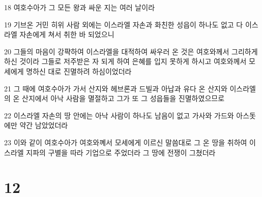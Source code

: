 \par 18 여호수아가 그 모든 왕과 싸운 지는 여러 날이라
\par 19 기브온 거민 히위 사람 외에는 이스라엘 자손과 화친한 성읍이 하나도 없고 다 이스라엘 자손에게 쳐서 취한 바 되었으니
\par 20 그들의 마음이 강퍅하여 이스라엘을 대적하여 싸우러 온 것은 여호와께서 그리하게 하신 것이라 그들로 저주받은 자 되게 하여 은혜를 입지 못하게 하시고 여호와께서 모세에게 명하신 대로 진멸하려 하심이었더라
\par 21 그 때에 여호수아가 가서 산지와 헤브론과 드빌과 아납과 유다 온 산지와 이스라엘의 온 산지에서 아낙 사람을 멸절하고 그가 또 그 성읍들을 진멸하였으므로
\par 22 이스라엘 자손의 땅 안에는 아낙 사람이 하나도 남음이 없고 가사와 가드와 아스돗에만 약간 남았었더라
\par 23 이와 같이 여호수아가 여호와꼐서 모세에게 이르신 말씀대로 그 온 땅을 취하여 이스라엘 지파의 구별을 따라 기업으로 주었더라 그 땅에 전쟁이 그쳤더라

\chapter{12}

